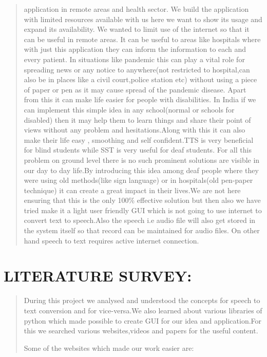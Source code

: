 \documentclass[]{article}
\begin{document}
\begin{quote}
application in remote areas and health sector. We build the application
with limited resources available with us here we want to show its usage
and expand its availability. We wanted to limit use of the internet so
that it can be useful in remote areas. It can be useful to areas like
hospitals where with just this application they can inform the
information to each and every patient. In situations like pandemic this
can play a vital role for spreading news or any notice to anywhere(not
restricted to hospital,can also be in places like a civil court,police
station etc) without using a piece of paper or pen as it may cause
spread of the pandemic disease. Apart from this it can make life easier
for people with disabilities. In India if we can implement this simple
idea in any school(normal or schools for disabled) then it may help them
to learn things and share their point of views without any problem and
hesitations.Along with this it can also make their life easy , smoothing
and self conﬁdent.TTS is very beneﬁcial for blind students while SST is
very useful for deaf students. For all this problem on ground level
there is no such prominent solutions are visible in our day to day
life.By introducing this idea among deaf people where they were using
old methods(like sign language) or in hospitals(old pen-paper technique)
it can create a great impact in their lives.We are not here ensuring
that this is the only 100\% eﬀective solution but then also we have
tried make it a light user friendly GUI which is not going to use
internet to convert text to speech.Also the speech i.e audio ﬁle will
also get stored in the system itself so that record can be maintained
for audio ﬁles. On other hand speech to text requires active internet
connection.
\end{quote}

\section{LITERATURE SURVEY:}\label{literature-survey}

\begin{quote}
During this project we analysed and understood the concepts for speech
to text conversion and for vice-versa.We also learned about various
libraries of python which made possible to create GUI for our idea and
application.For this we searched various websites,videos and papers for
the useful content.

Some of the websites which made our work easier are:
\end{quote}
\end{document}
